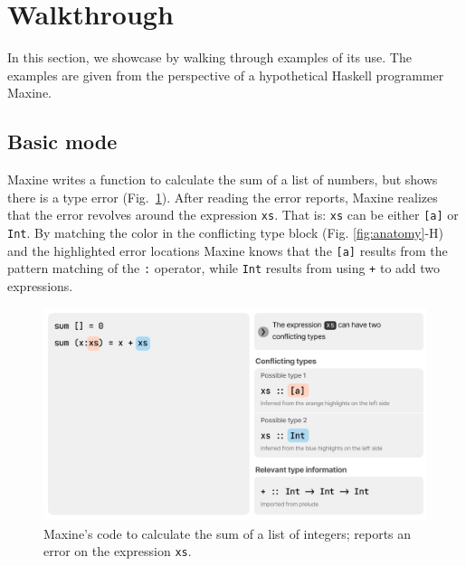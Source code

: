 \section{Walkthrough} \label{sec:walkthrough}
In this section, we showcase \chameleon{} by walking through examples of its
use. The examples are given from the perspective of a hypothetical Haskell 
programmer Maxine. 


\subsection{Basic mode} \label{sub:basic}
Maxine writes a function to calculate the sum of a list of
numbers, but \chameleon{} shows there is a type error (Fig.~\ref{fig:basic-mode-1}). 
After reading the error reports, Maxine realizes that the error revolves 
around the expression \texttt{xs}. That is: \texttt{xs} can be
either \texttt{[a]} or \texttt{Int}. By matching the color in the
conflicting type block (Fig. \ref{fig:anatomy}-H) and the highlighted error locations 
Maxine knows that the \texttt{[a]} results from the pattern matching of the
\texttt{:} operator, while \texttt{Int} results from using \texttt{+} to
 add two expressions. 

\begin{figure}
        \centering
        \includegraphics[width=\linewidth,trim=0mm 8mm 0mm 0mm]{images/basic-mode-1.pdf}
        \caption{
            Maxine's code to calculate the sum of a list of integers;
            \chameleon{} reports an error on the expression \texttt{xs}.
            }
            \label{fig:basic-mode-1}
\end{figure}

